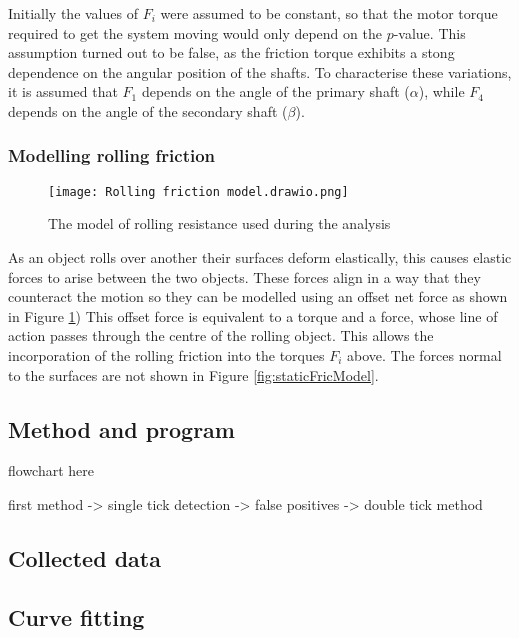 \documentclass[12pt]{article}
\begin{document}
Initially the values of $F_i$ were assumed to be constant, so that the motor torque required to get the system moving would only depend on the $p$-value. This assumption turned out to be false, as the friction torque exhibits a stong dependence on the angular position of the shafts. To characterise these variations, it is assumed that $F_1$ depends on the angle of the primary shaft ($\alpha$), while $F_4$ depends on the angle of the secondary shaft ($\beta$).



\subsubsection{Modelling rolling friction}
\label{sec:rollingFric}
\begin{figure}[h]
    \centering
    \texttt{[image: Rolling friction model.drawio.png]}
    \caption{The model of rolling resistance used during the analysis}
    \label{fig:rollingFriction}
\end{figure}


As an object rolls over another their surfaces deform elastically, this causes elastic forces to arise between the two objects. These forces align in a way that they counteract the motion so they can be modelled using an offset net force as shown in Figure \ref{fig:rollingFriction}) This offset force is equivalent to a torque and a force, whose line of action passes through the centre of the rolling object. This allows the incorporation of the rolling friction into the torques $F_i$ above. The forces normal to the surfaces are not shown in Figure \ref{fig:staticFricModel}.   





\subsection{Method and program}



flowchart here

first method -> single tick detection -> false positives -> double tick method


\subsection{Collected data}
\subsection{Curve fitting}
\end{document}
